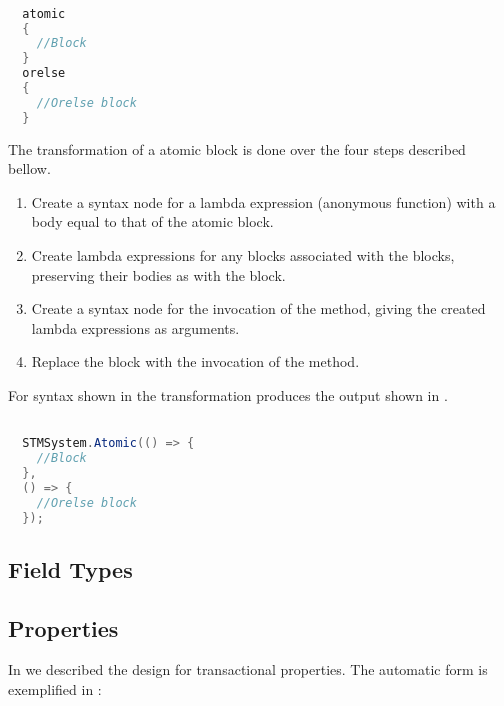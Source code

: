 \begin{lstlisting}[label=lst:before_atomic_block,
  caption={\bscode{atomic} Block Before Transformation},
  language=Java,  
  showspaces=false,
  showtabs=false,
  breaklines=true,
  showstringspaces=false,
  breakatwhitespace=true,
  commentstyle=\color{greencomments},
  keywordstyle=\color{bluekeywords},
  stringstyle=\color{redstrings},
  morekeywords={atomic, retry, orelse, var, get, set}]  % Start your code-block

  atomic
  {
    //Block
  }
  orelse
  {
    //Orelse block
  }
\end{lstlisting}
The transformation of a atomic block is done over the four steps described bellow.
\begin{enumerate}
	\item Create a syntax node for a lambda expression (anonymous function) with a body equal to that of the atomic block.
	\item Create lambda expressions for any  blocks associated with the  blocks, preserving their bodies as with the  block.
	\item Create a syntax node for the invocation of the  method, giving the created lambda expressions as arguments.
	\item Replace the  block with the invocation of the  method.
\end{enumerate}
For syntax shown in  the transformation produces the output shown in .

\begin{lstlisting}[label=lst:after_atomic_block,
  caption={\bscode{atomic} Block After Transformation},
  language=Java,  
  showspaces=false,
  showtabs=false,
  breaklines=true,
  showstringspaces=false,
  breakatwhitespace=true,
  commentstyle=\color{greencomments},
  keywordstyle=\color{bluekeywords},
  stringstyle=\color{redstrings},
  morekeywords={atomic, retry, orelse, var, get, set}]  % Start your code-block

  STMSystem.Atomic(() => {
    //Block					
  },
  () => {
    //Orelse block
  });
\end{lstlisting}

\subsection{Field Types}\label{subsec:extension_field}
\subsection{Properties}
In  we described the design for transactional properties. The automatic form is exemplified in :

